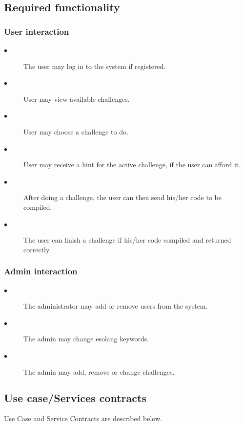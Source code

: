 \documentclass[english]{article}
\begin{document}
		\subsection{Required functionality}
		\subsubsection{User interaction}
		\begin{description}
			\item[$\bullet$] The user may log in to the system if registered.
			\item[$\bullet$] User may view available challenges.
			\item[$\bullet$] User may choose a challenge to do.
			\item[$\bullet$] User may receive a hint for the active challenge, if the user can afford it.
			\item[$\bullet$] After doing a challenge, the user can then send his/her code to be compiled.
			\item[$\bullet$] The user can finish a challenge if his/her code compiled and returned correctly.
		\end{description}
		
		\subsubsection{Admin interaction}
		\begin{description}
			\item[$\bullet$] The administrator may add or remove users from the system.
			\item[$\bullet$] The admin may change esolang keywords.
			\item[$\bullet$] The admin may add, remove or change challenges.
		\end{description}

		
		\subsection{Use case/Services contracts}
		Use Case and Service Contracts are described below.
		
		
		
\end{document}
